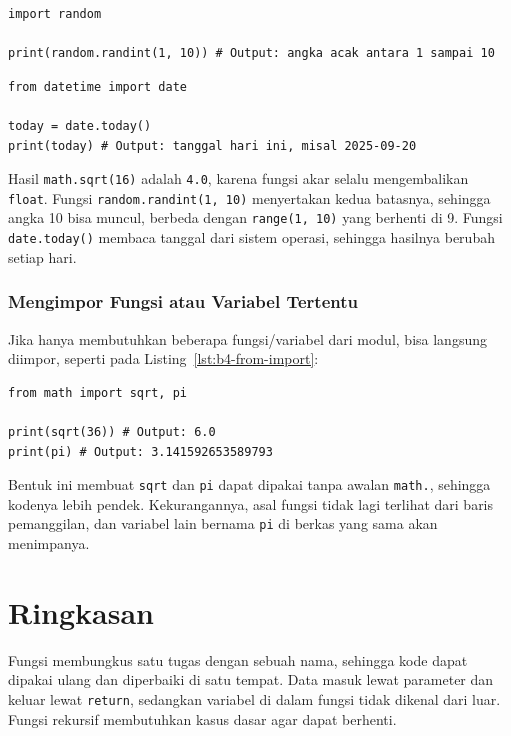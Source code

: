 \begin{lstlisting}[style=PythonStyle, caption={Kode Python: random_module.py}, label={lst:b4-random}]
import random

print(random.randint(1, 10)) # Output: angka acak antara 1 sampai 10
\end{lstlisting}

\begin{lstlisting}[style=PythonStyle, caption={Kode Python: datetime_module.py}, label={lst:b4-datetime}]
from datetime import date

today = date.today()
print(today) # Output: tanggal hari ini, misal 2025-09-20
\end{lstlisting}

Hasil \texttt{math.sqrt(16)} adalah \texttt{4.0}, karena fungsi akar selalu mengembalikan \texttt{float}. Fungsi \texttt{random.randint(1, 10)} menyertakan kedua batasnya, sehingga angka 10 bisa muncul, berbeda dengan \texttt{range(1, 10)} yang berhenti di 9. Fungsi \texttt{date.today()} membaca tanggal dari sistem operasi, sehingga hasilnya berubah setiap hari.

\subsubsection{Mengimpor Fungsi atau Variabel Tertentu}

Jika hanya membutuhkan beberapa fungsi/variabel dari modul, bisa langsung diimpor, seperti pada Listing~\ref{lst:b4-from-import}:

\begin{lstlisting}[style=PythonStyle, caption={Mengimpor fungsi dan variabel tertentu dari modul math}, label={lst:b4-from-import}]
from math import sqrt, pi

print(sqrt(36)) # Output: 6.0
print(pi) # Output: 3.141592653589793
\end{lstlisting}

Bentuk ini membuat \texttt{sqrt} dan \texttt{pi} dapat dipakai tanpa awalan \texttt{math.}, sehingga kodenya lebih pendek. Kekurangannya, asal fungsi tidak lagi terlihat dari baris pemanggilan, dan variabel lain bernama \texttt{pi} di berkas yang sama akan menimpanya.

\section{Ringkasan}
Fungsi membungkus satu tugas dengan sebuah nama, sehingga kode dapat dipakai ulang dan diperbaiki di satu tempat. Data masuk lewat parameter dan keluar lewat \texttt{return}, sedangkan variabel di dalam fungsi tidak dikenal dari luar. Fungsi rekursif membutuhkan kasus dasar agar dapat berhenti.

